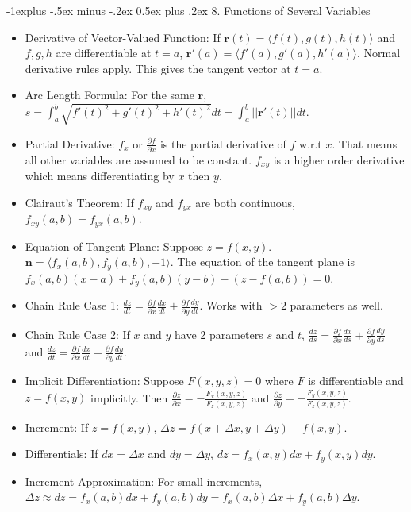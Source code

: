\documentclass[10pt, portrait]{article}
\makeatletter
\renewcommand{\section}{\@startsection{section}{1}{0mm}%
                                {-1ex plus -.5ex minus -.2ex}%
                                {0.5ex plus .2ex}%
                                {\normalfont\large\bfseries}}
\renewcommand{\section}{\@startsection{section}{2}{0mm}%
                                {-1explus -.5ex minus -.2ex}%
                                {0.5ex plus .2ex}%
                                {\normalfont\normalsize\bfseries}}
\makeatother
\begin{document}
\begin{multicols*}{2}
\section{8. Functions of Several Variables}
\begin{itemize}
    \item Derivative of Vector-Valued Function: If $\bm{r}(t)=\langle f(t),g(t),h(t)\rangle$ and $f,g,h$ are differentiable at $t=a$, $\bm{r}'(a)=\langle f'(a),g'(a),h'(a)\rangle$. Normal derivative rules apply. This gives the tangent vector at $t=a$.
    \item Arc Length Formula: For the same $\bm{r}$, $s=\int_a^b\sqrt{f'(t)^2+g'(t)^2+h'(t)^2}dt=\int_a^b||\bm{r}'(t)||dt$.
    \item Partial Derivative:  $f_x$ or $\frac{\partial f}{\partial x}$ is the partial derivative of $f$ w.r.t $x$. That means all other variables are assumed to be constant. $f_{xy}$ is a higher order derivative which means differentiating by $x$ then $y$.
    \item Clairaut's Theorem: If $f_{xy}$ and $f_{yx}$ are both continuous, $f_{xy}(a,b)=f_{yx}(a,b)$.
    \item Equation of Tangent Plane: Suppose $z=f(x,y)$. $\bm{n}=\langle f_x(a,b),f_y(a,b),-1\rangle$. The equation of the tangent plane is $f_x(a,b)(x-a)+f_y(a,b)(y-b)-(z-f(a,b))=0$.
    \item Chain Rule Case 1: $\frac{dz}{dt}=\frac{\partial f}{\partial x}\frac{dx}{dt}+\frac{\partial f}{\partial y}\frac{dy}{dt}$. Works with $> 2$ parameters as well.
    \item Chain Rule Case 2: If $x$ and $y$ have 2 parameters $s$ and $t$, $\frac{dz}{ds}=\frac{\partial f}{\partial x}\frac{dx}{ds}+\frac{\partial f}{\partial y}\frac{dy}{ds}$ and $\frac{dz}{dt}=\frac{\partial f}{\partial x}\frac{dx}{dt}+\frac{\partial f}{\partial y}\frac{dy}{dt}$.
    \item Implicit Differentiation: Suppose $F(x,y,z)=0$ where $F$ is differentiable and $z=f(x,y)$ implicitly. Then $\frac{\partial z}{\partial x}=-\frac{F_x(x,y,z)}{F_z(x,y,z)}$ and $\frac{\partial z}{\partial y}=-\frac{F_y(x,y,z)}{F_z(x,y,z)}$.
    \item Increment: If $z=f(x,y)$, $\Delta z=f(x+\Delta x, y+\Delta y)-f(x,y)$.
    \item Differentials: If $dx=\Delta x$ and $dy=\Delta y$, $dz=f_x(x,y)dx+f_y(x,y)dy$.
    \item Increment Approximation: For small increments, $\Delta z \approx dz=f_x(a,b)dx+f_y(a,b)dy=f_x(a,b)\Delta x+f_y(a,b)\Delta y$.

\end{itemize}
\end{multicols*}
\end{document}

